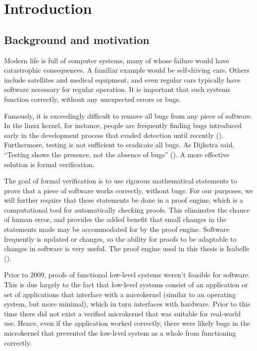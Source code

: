 \documentclass[twoside]{memoir}
\begin{document}
\tableofcontents


\mainmatter

\chapter{Introduction}

\section{Background and motivation}

Modern life is full of computer systems,
many of whose failure would have catastrophic consequences.
A familiar example would be self-driving cars.
Others include satellites and medical equipment, and even regular cars
typically have software necessary for regular operation.
It is important that such systems function correctly, without any
unexpected errors or bugs.

Famously, it is exceedingly difficult to remove all bugs
from any piece of software.
In the linux kernel, for instance, people are frequently finding bugs
introduced early in the development process that evaded detection until recently
(\cite{Amlogic2016S905}).
Furthermore, testing is not sufficient to eradicate all bugs.
As Dijkstra said, ``Testing shows the presence, not the absence of bugs''
(\cite{dijkstra-quote}).
A more effective solution is formal verification.

The goal of formal verification is to use rigorous mathematical statements
to prove that a piece of software works correctly, without bugs.
For our purposes, we will further require that these statements be
done in a proof engine, which is a computational tool for 
automatically checking proofs.
This eliminates the chance of human error,
and provides the added benefit that small changes in the statements made
may be accommodated for by the proof engine.
Software frequently is updated or changes, so the ability for proofs
to be adaptable to changes in software is very useful.
The proof engine used in this thesis is Isabelle (\cite{wenzel2008isabelle}).

Prior to 2009, proofs of functional low-level systems weren't
feasible for software.
This is due largely to the fact that low-level systems consist of
an application or set of applications that interface with
a microkernel (similar to an operating system, but more minimal),
which in turn interfaces with hardware.
Prior to this time there did not exist a verified microkernel
that was suitable for real-world use.
Hence, even if the application worked correctly,
there were likely bugs in the microkernel that prevented the low-level system
as a whole from functioning correctly.
\end{document}
